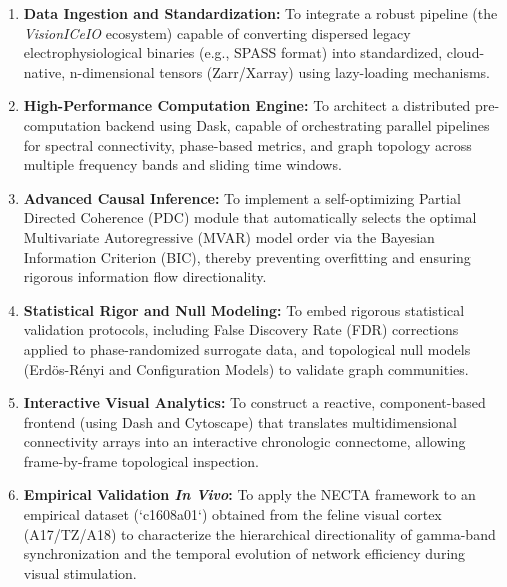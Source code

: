 \begin{enumerate}
\item \textbf{Data Ingestion and Standardization:} To integrate a robust pipeline (the \textit{VisionICeIO} ecosystem) capable of converting dispersed legacy electrophysiological binaries (e.g., SPASS format) into standardized, cloud-native, n-dimensional tensors (Zarr/Xarray) using lazy-loading mechanisms.
    
\item \textbf{High-Performance Computation Engine:} To architect a distributed pre-computation backend using Dask, capable of orchestrating parallel pipelines for spectral connectivity, phase-based metrics, and graph topology across multiple frequency bands and sliding time windows.

\item \textbf{Advanced Causal Inference:} To implement a self-optimizing Partial Directed Coherence (PDC) module that automatically selects the optimal Multivariate Autoregressive (MVAR) model order via the Bayesian Information Criterion (BIC), thereby preventing overfitting and ensuring rigorous information flow directionality.

\item \textbf{Statistical Rigor and Null Modeling:} To embed rigorous statistical validation protocols, including False Discovery Rate (FDR) corrections applied to phase-randomized surrogate data, and topological null models (Erdös-Rényi and Configuration Models) to validate graph communities.

\item \textbf{Interactive Visual Analytics:} To construct a reactive, component-based frontend (using Dash and Cytoscape) that translates multidimensional connectivity arrays into an interactive chronologic connectome, allowing frame-by-frame topological inspection.

\item \textbf{Empirical Validation \textit{In Vivo}:} To apply the NECTA framework to an empirical dataset (`c1608a01`) obtained from the feline visual cortex (A17/TZ/A18) to characterize the hierarchical directionality of gamma-band synchronization and the temporal evolution of network efficiency during visual stimulation.
\end{enumerate}